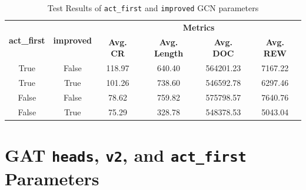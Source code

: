   \begin{table}[H]
	\centering
	\caption{Test Results of \texttt{act\_first} and \texttt{improved} \ac{GCN} parameters}
	\begin{tabular}{cccccc}
		\toprule
		\multirow{2}{*}{\textbf{act\_first}} & \multirow{2}{*}{\textbf{improved}} & \multicolumn{4}{c}{\textbf{Metrics}} \\ 
		\cmidrule(lr){3-6}
		&  &  \textbf{Avg. CR} & \textbf{Avg. Length} & \textbf{Avg. DOC} & \textbf{Avg. REW} \\ 
		\midrule
		True & False & 118.97 & 640.40 & 564201.23 & 7167.22 \\
		True & True & 101.26 & 738.60 & 546592.78 & 6297.46 \\
		False & False & 78.62 & 759.82 & 575798.57& 7640.76 \\
		False & True & 75.29 & 328.78 & 548378.53 & 5043.04 \\
		\bottomrule
	\end{tabular}
	\label{tab:test-gcn-params2}
\end{table}

\section{\ac{GAT} \texttt{heads}, \texttt{v2}, and \texttt{act\_first} Parameters}

